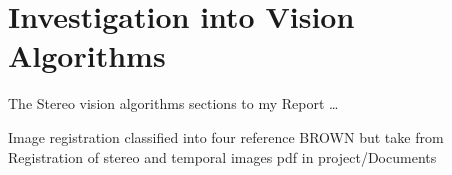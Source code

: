 \chapter{Investigation into Vision Algorithms} \label{Chapter:InvestigationVision}
The Stereo vision algorithms sections to my Report \dots

Image registration classified into four 
reference BROWN but take from Registration of stereo and temporal images pdf in project/Documents